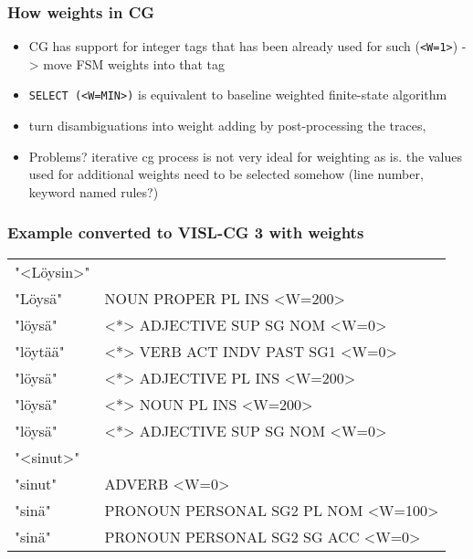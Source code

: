\documentclass{beamer}
\begin{document}
\begin{frame}
    \frametitle{How weights in CG}
    \begin{itemize}
        \item CG has support for integer tags that has been already
            used for such (\texttt{<W=1>}) -> move FSM weights into
            that tag
        \item \texttt{SELECT (<W=MIN>)} is equivalent to baseline
            weighted finite-state algorithm
        \item turn disambiguations into weight adding by post-processing
            the traces,
        \item Problems? iterative cg process is not very ideal for weighting as is.
            the values used for additional weights need to be selected
            somehow (line number, keyword named rules?)
    \end{itemize}
\end{frame}

\begin{frame}
    \frametitle{Example converted to VISL-CG 3 with weights}
    \begin{tabular}{ll}
"<Löysin>" & \\
 "Löysä" & NOUN PROPER PL INS <W=200> \\
 "löysä" & <*> ADJECTIVE SUP SG NOM <W=0> \\
 "löytää" & <*> VERB ACT INDV PAST SG1 <W=0> \\
 "löysä" & <*> ADJECTIVE PL INS <W=200> \\
 "löysä" & <*> NOUN PL INS <W=200> \\
 "löysä" & <*> ADJECTIVE SUP SG NOM <W=0> \\
"<sinut>" & \\
 "sinut" & ADVERB <W=0> \\
 "sinä" & PRONOUN PERSONAL SG2 PL NOM <W=100> \\
 "sinä" & PRONOUN PERSONAL SG2 SG ACC <W=0> \\
\end{tabular}
\end{frame}
\end{document}
